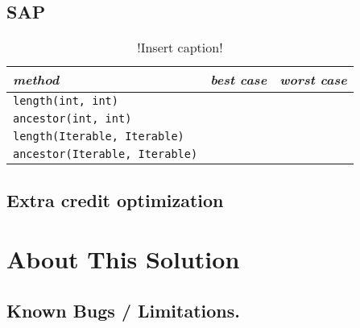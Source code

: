 \documentclass[11pt,a4paper,notitlepage]{article}
\newcommand{\explanation}[1]{}  %
\begin{document}
\subsection{SAP}
\explanation{
  Describe concisely your algorithm to compute the shortest ancestral
  path in SAP.java? What is the order of growth of the worst-case
  running time of your methods as a function of the number of
  vertices $V$ and the number of edges $E$ in the digraph? What is the
  order of growth of the best-case running time?}



\begin{table}[htbp]
\renewcommand{\arraystretch}{2}
  \centering
  \caption{!Insert caption!}
        \label{tab:table1}
        \begin{tabular}{l| c | c }
         \emph{method} & \qquad \emph{best case} \qquad & \qquad \emph{worst case} \qquad \\
        \hline
\texttt{length(int, int)}  & & \\\hline

\texttt{ancestor(int, int)}  & & \\\hline

\texttt{length(Iterable, Iterable)}  & & \\\hline

\texttt{ancestor(Iterable, Iterable)}  & & \\\hline

        \hline
        \end{tabular}
\end{table}


\subsection{Extra credit optimization}

\explanation{If you implemented an extra credit optimization describe it here.}


\section{About This Solution}

 
\subsection{Known Bugs / Limitations.}
\explanation{Known bugs / limitations. For example, if your program prints
  out different representations of the same line segment when there
 are 5 or more points on a line segment, indicate that here.}
\end{document}
